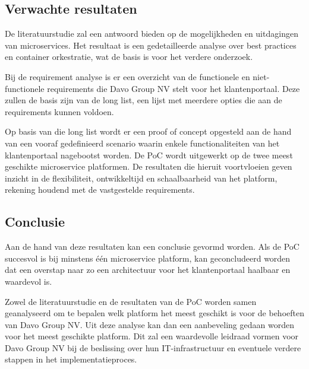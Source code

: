 \subsection{Verwachte resultaten}
De literatuurstudie zal een antwoord bieden op de mogelijkheden en uitdagingen van microservices. Het resultaat is een gedetailleerde analyse over best practices en container orkestratie, wat de basis is voor het verdere onderzoek.

Bij de requirement analyse is er een overzicht van de functionele en niet-functionele requirements die Davo Group NV stelt voor het klantenportaal. Deze zullen de basis zijn van de long list, een lijst met meerdere opties die aan de requirements kunnen voldoen. 

Op basis van die long list wordt er een proof of concept opgesteld aan de hand van een vooraf gedefinieerd scenario waarin enkele functionaliteiten van het klantenportaal nagebootst worden. De PoC wordt uitgewerkt op de twee meest geschikte microservice platformen. De resultaten die hieruit voortvloeien geven inzicht in de flexibiliteit, ontwikkeltijd en schaalbaarheid van het platform, rekening houdend met de vastgestelde requirements.
\newline
\newline
\subsection{Conclusie}
Aan de hand van deze resultaten kan een conclusie gevormd worden. Als de PoC succesvol is bij minstens één microservice platform, kan geconcludeerd worden dat een overstap naar zo een architectuur voor het klantenportaal haalbaar en waardevol is. 

Zowel de literatuurstudie en de resultaten van de PoC worden samen geanalyseerd om te bepalen welk platform het meest geschikt is voor de behoeften van Davo Group NV. Uit deze analyse kan dan een aanbeveling gedaan worden voor het meest geschikte platform. Dit zal een waardevolle leidraad vormen voor Davo Group NV bij de beslissing over hun IT-infrastructuur en eventuele verdere stappen in het implementatieproces.
%
%

